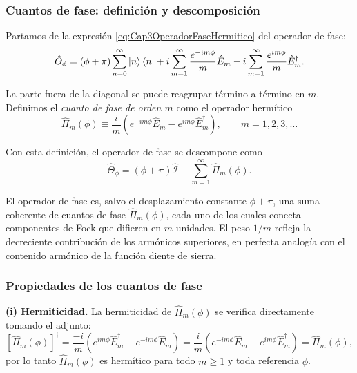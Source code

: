             \subsubsection{Cuantos de fase: definición y descomposición}

                Partamos de la expresión \ref{eq:Cap3OperadorFaseHermitico} del operador de fase:
                \begin{equation*}
                    \hat{\Theta}_\phi = \left(\phi + \pi\right)\sum_{n=0}^{\infty}\ket{n}\bra{n} + i\sum_{m=1}^{\infty}\frac{e^{-im\phi}}{m}\hat{E}_m - i\sum_{m=1}^{\infty}\frac{e^{im\phi}}{m}\hat{E}_m^\dagger.
                \end{equation*}

                La parte fuera de la diagonal se puede reagrupar término a término en $m$. Definimos el \textit{cuanto de fase de orden $m$} como el operador hermítico
                \begin{equation}\label{eq:Cap3CuantoDeFase}
                    \hat{\Pi}_m(\phi) \equiv \frac{i}{m}\left(e^{-im\phi}\hat{E}_m - e^{im\phi}\hat{E}_m^\dagger\right), \qquad m = 1, 2, 3, \ldots
                \end{equation}

                Con esta definición, el operador de fase se descompone como
                \begin{equation}\label{eq:Cap3DescomposicionEspectral}
                    \hat{\Theta}_\phi = \left(\phi+\pi\right)\hat{\mathcal{I}} + \sum_{m=1}^{\infty}\hat{\Pi}_m(\phi).
                \end{equation}

                El operador de fase es, salvo el desplazamiento constante $\phi+\pi$, una suma coherente de cuantos de fase $\hat{\Pi}_m(\phi)$, cada uno de los cuales conecta componentes de Fock que difieren en $m$ unidades. El peso $1/m$ refleja la decreciente contribución de los armónicos superiores, en perfecta analogía con el contenido armónico de la función diente de sierra.

            \subsubsection{Propiedades de los cuantos de fase}

                \textbf{(i) Hermiticidad.} La hermiticidad de $\hat{\Pi}_m(\phi)$ se verifica directamente tomando el adjunto:
                \begin{equation*}
                    \left[\hat{\Pi}_m(\phi)\right]^\dagger = \frac{-i}{m}\left(e^{im\phi}\hat{E}_m^\dagger - e^{-im\phi}\hat{E}_m\right) = \frac{i}{m}\left(e^{-im\phi}\hat{E}_m - e^{im\phi}\hat{E}_m^\dagger\right) = \hat{\Pi}_m(\phi),
                \end{equation*}
                por lo tanto $\hat{\Pi}_m(\phi)$ es hermítico para todo $m \geq 1$ y toda referencia $\phi$.

